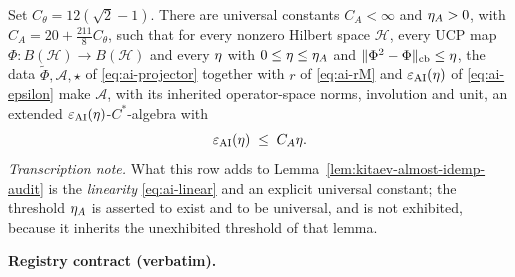 \begin{lemma}\label{lem:routef-ai-defect-linearization}
Set $C_{\theta}=12(\sqrt2-1)$. There are universal constants $C_{A}<\infty$ and
$\eta_{A}>0$, with $C_{A}=20+\tfrac{211}{8}C_{\theta}$, such that for every nonzero
Hilbert space $\mathcal H$, every UCP map $\Phi:B(\mathcal H)\to B(\mathcal H)$ and every
$\eta$ with $0\le\eta\le\eta_{A}$ and
$\lVert \Phi^{2}-\Phi\rVert_{\mathrm{cb}}\le\eta$, the data
$\widetilde\Phi,\mathcal A,\star$ of \eqref{eq:ai-projector} together with $r$ of
\eqref{eq:ai-rM} and $\varepsilon_{\mathrm{AI}}(\eta)$ of \eqref{eq:ai-epsilon} make
$\mathcal A$, with its inherited operator-space norms, involution and unit, an extended
$\varepsilon_{\mathrm{AI}}(\eta)$-$C^{*}$-algebra with
\begin{equation}\label{eq:ai-linear}
  \varepsilon_{\mathrm{AI}}(\eta)\;\le\;C_{A}\eta .
\end{equation}
\emph{Transcription note.} What this row adds to
Lemma~\ref{lem:kitaev-almost-idemp-audit} is the \emph{linearity} \eqref{eq:ai-linear} and
an explicit universal constant; the threshold $\eta_{A}$ is asserted to exist and to be
universal, and is not exhibited, because it inherits the unexhibited threshold of that
lemma.
\end{lemma}

\noindent\textbf{Registry contract (verbatim).}

